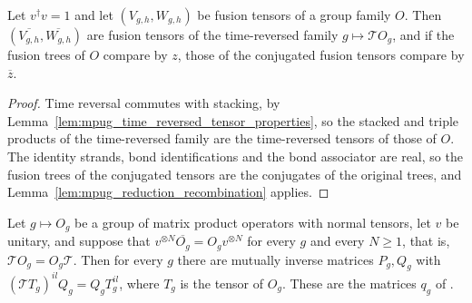\begin{lemma}
    \label{lem:mpug_conjugated_fusion_tensors}
    \leanok
    Let $v^\dagger v=1$ and let $(V_{g,h},W_{g,h})$ be fusion tensors of a
    group family $O$. Then $(\overline{V_{g,h}},\overline{W_{g,h}})$ are
    fusion tensors of the time-reversed family $g\mapsto\mathcal TO_g$, and
    if the fusion trees of $O$ compare by $z$, those of the conjugated
    fusion tensors compare by $\overline z$.
\end{lemma}

\begin{proof}
    \leanok
    Time reversal commutes with stacking, by
    Lemma~\ref{lem:mpug_time_reversed_tensor_properties}, so the stacked
    and triple products of the time-reversed family are the time-reversed
    tensors of those of $O$. The identity strands, bond identifications and
    the bond associator are real, so the fusion trees of the conjugated
    tensors are the conjugates of the original trees, and
    Lemma~\ref{lem:mpug_reduction_recombination} applies.
\end{proof}

\begin{lemma}
    \label{lem:mpug_time_reversal_bond_gauge}
    \leanok
    Let $g\mapsto O_g$ be a group of matrix product operators with normal
    tensors, let $v$ be unitary, and suppose that
    $v^{\otimes N}\overline{O_g}=O_gv^{\otimes N}$ for every $g$ and every
    $N\geq1$, that is, $\mathcal TO_g=O_g\mathcal T$. Then for every $g$
    there are mutually inverse matrices $P_g,Q_g$ with
    $(\mathcal TT_g)^{il}Q_g=Q_gT_g^{il}$, where $T_g$ is the tensor of
    $O_g$. These are the matrices $q_g$ of
    \cite[Section~4.3]{GarreRubio2023MPOSym}.
\end{lemma}

